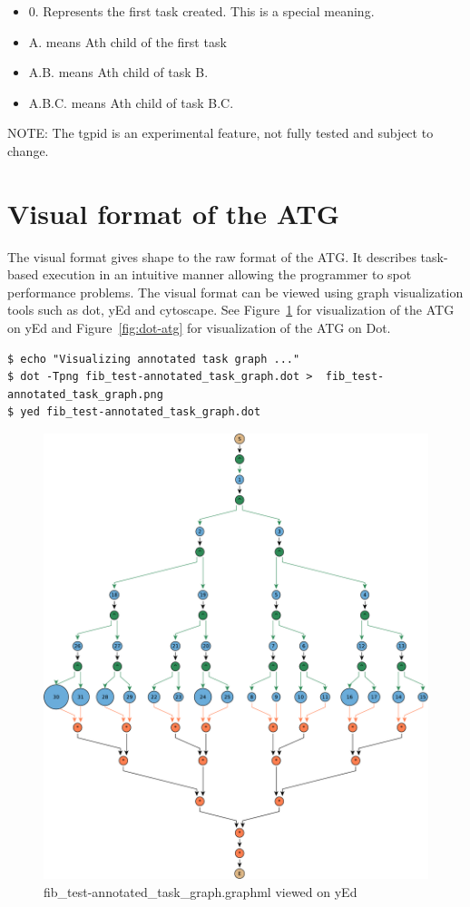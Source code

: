 \documentclass[11pt,a4paper,notitlepage]{article}
\begin{document}
\begin{itemize}
\item 0. Represents the first task created. This is a special meaning.
\item A. means Ath child of the first task
\item A.B. means Ath child of task B.
\item A.B.C. means Ath child of task B.C.
\end{itemize}

NOTE: The tgpid is an experimental feature, not fully tested and subject to change.

\section{Visual format of the ATG}
The visual format gives shape to the raw format of the ATG.
It describes task-based execution in an intuitive manner allowing the programmer to spot performance problems.
The visual format can be viewed using graph visualization tools such as dot, yEd and cytoscape.
See Figure~\ref{fig:yed-atg} for visualization of the ATG on yEd and Figure~\ref{fig:dot-atg} for visualization of the ATG on Dot.

\begin{lstlisting}[style=BashInputStyle]
$ echo "Visualizing annotated task graph ..."
$ dot -Tpng fib_test-annotated_task_graph.dot >  fib_test-annotated_task_graph.png
$ yed fib_test-annotated_task_graph.dot 
\end{lstlisting}

\begin{figure}[!ht]
\centering
\includegraphics[width=\textwidth]{figures/fib_test-10_4-annotated_task_graph.pdf}
\caption{fib\_test-annotated\_task\_graph.graphml viewed on yEd}
\label{fig:yed-atg}
\end{figure}
\end{document}
